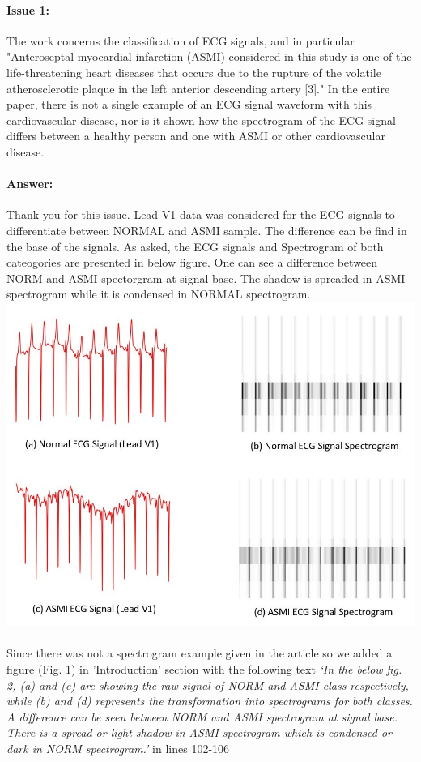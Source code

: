 \documentclass{article}
\begin{document}
\paragraph{Issue 1:}
\begin{displayquote}
The work concerns the classification of ECG signals, and in particular "Anteroseptal myocardial infarction (ASMI) considered in this study is one of the life-threatening heart diseases that occurs due to the rupture of the volatile atherosclerotic plaque in the left anterior descending artery [3]." In the entire paper, there is not a single example of an ECG signal waveform with this cardiovascular disease, nor is it shown how the spectrogram of the ECG signal differs between a healthy person and one with ASMI or other cardiovascular disease.
\end{displayquote}

\paragraph{Answer:}
Thank you for this issue. Lead V1 data was considered for the ECG signals to differentiate between NORMAL and ASMI sample. The difference can be find in the base of the signals. As asked, the ECG signals and Spectrogram of both cateogories are presented in below figure. One can see a difference between NORM and ASMI spectorgram at signal base. The shadow is spreaded in ASMI spectrogram while it is condensed in NORMAL spectrogram.
\includegraphics[scale=0.55]{Signal and spectrogram img.JPG}
\\\\
Since there was not a spectrogram example given in the article so we added a figure (Fig. 1) in 'Introduction' section with the following text \textit{`In the below fig. 2, (a) and (c) are showing the raw signal of NORM and ASMI class respectively, while (b) and (d) represents the transformation into spectrograms for both classes. A difference can be seen between NORM and ASMI spectrogram at signal base. There is a spread or light shadow in ASMI spectrogram which is condensed or dark in NORM spectrogram.'} in lines 102-106
\end{document}
